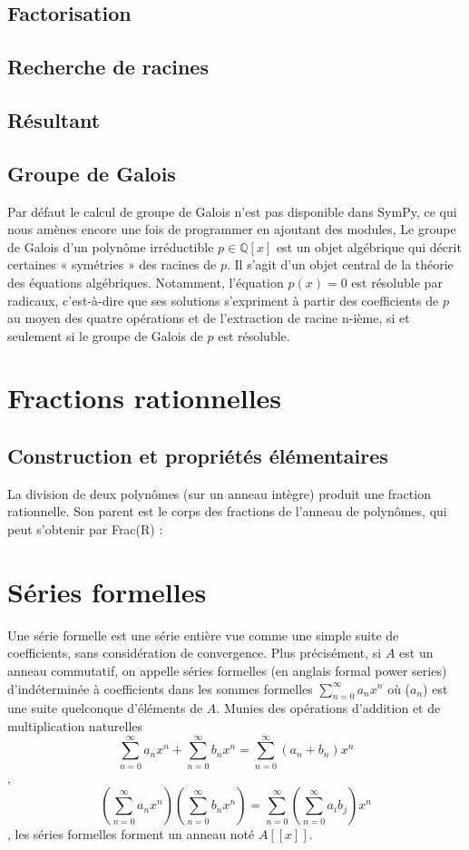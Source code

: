  \subsection{Factorisation}
 \subsection{ Recherche de racines}
 \subsection{ Résultant}
 \subsection{ Groupe de Galois}
 Par défaut le calcul de groupe de Galois n'est pas disponible dans SymPy, ce qui nous amènes encore
 une fois de programmer en ajoutant des modules, Le groupe de Galois d’un polynôme irréductible $p \in \mathbb{Q}\left[x\right]$ est un objet algébrique qui décrit certaines « symétries » des racines de $p$. Il s’agit d’un objet central de la théorie des équations algébriques. Notamment, l’équation $p\left(x\right) = 0$
est résoluble par radicaux, c’est-à-dire que ses solutions s’expriment à partir des coefficients de $p$ au moyen des quatre opérations et de l'extraction de racine n-ième, si et seulement si le groupe de Galois de $p$ est résoluble.
\section{ Fractions rationnelles}
 \subsection{ Construction et propriétés élémentaires}
 La division de deux polynômes (sur un anneau intègre) produit une fraction rationnelle. Son parent est le corps des fractions de l’anneau de polynômes, qui peut s’obtenir par Frac(R) :
 \section{Séries formelles}
 Une série formelle est une série entière vue comme une simple suite de coefficients, sans considération de convergence. Plus précisément, si $A$ est un anneau commutatif, on appelle séries formelles (en anglais formal
 power series) d’indéterminée  à coefficients dans  les sommes formelles $\sum_{n=0}^{\infty} a_{n}x^{n}$ où ($a_{n}$) est une suite quelconque d’éléments de $A$. Munies des opérations d’addition et de multiplication naturelles
\[
 \sum_{n=0}^{\infty} a_{n}x^{n} + \sum_{n=0}^{\infty} b_{n}x^{n} = \sum_{n=0}^{\infty} \left(a_{n}+b_{n}\right) x^{n} 
 \],
\[
 \left(\sum_{n=0}^{\infty} a_{n}x^{n}\right) \left(\sum_{n=0}^{\infty} b_{n}x^{n}\right) =  \sum_{n=0}^{\infty} \left( \sum_{n=0}^{\infty} a_{i}b_{j}\right)x^{n}
\], les séries formelles forment un anneau noté $A\left[ \left[ x\right] \right] $.\\

